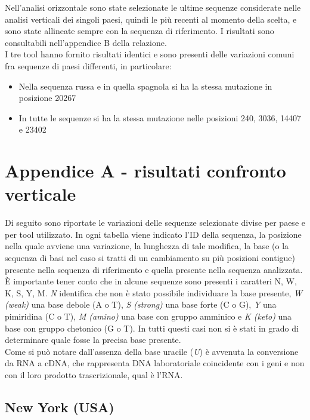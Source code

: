 \documentclass[a4paper,10pt]{article}
\begin{document}
Nell'analisi orizzontale sono state selezionate le ultime sequenze considerate nelle analisi verticali dei singoli paesi, quindi le più recenti al momento della scelta, e sono state allineate sempre con la sequenza di riferimento. I risultati sono consultabili nell'appendice B della relazione.\\
I tre tool hanno fornito risultati identici e sono presenti delle variazioni comuni fra sequenze di paesi differenti, in particolare:
\begin{itemize}
\item Nella sequenza russa e in quella spagnola si ha la stessa mutazione in posizione 20267
\item In tutte le sequenze si ha la stessa mutazione nelle posizioni 240, 3036, 14407 e 23402
\end{itemize}


\newpage

\section{Appendice A - risultati confronto verticale}
Di seguito sono riportate le variazioni delle sequenze selezionate divise per paese e per tool utilizzato. In ogni tabella viene indicato l'ID della sequenza, la posizione nella quale avviene una variazione, la lunghezza di tale modifica, la base (o la sequenza di basi nel caso si tratti di un cambiamento su più posizioni contigue) presente nella sequenza di riferimento e quella presente nella sequenza analizzata. \\
È importante tener conto che in alcune sequenze sono presenti i caratteri {N, W, K, S, Y, M}. \textit{N} identifica che non è stato possibile individuare la base presente, \textit{W (weak)} una base debole (A o T), \textit{S (strong)} una base forte (C o G), \textit{Y} una pimiridina (C o T), \textit{M (amino)} una base con gruppo amminico e \textit{K (keto)} una base con gruppo chetonico (G o T). In tutti questi casi non si è stati in grado di determinare quale fosse la precisa base presente. \\
Come si può notare dall'assenza della base uracile (\textit{U}) è avvenuta la conversione da RNA a cDNA, che rappresenta DNA laboratoriale coincidente con i geni e non con il loro prodotto trascrizionale, qual è l'RNA.

\subsection{New York (USA)}
\end{document}
